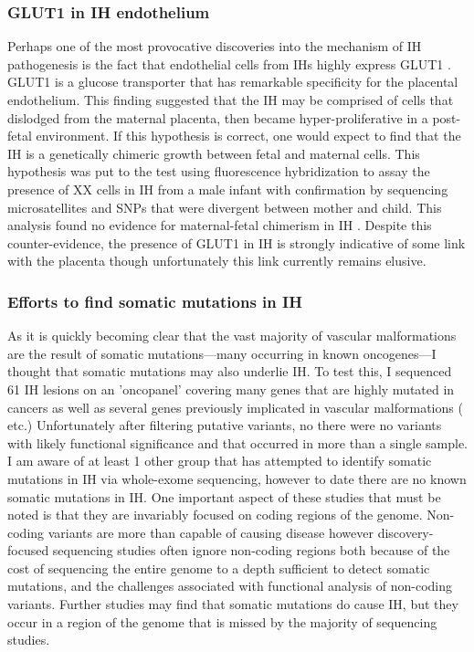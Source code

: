 \subsubsection{GLUT1 in IH endothelium}
Perhaps one of the most provocative discoveries into the mechanism of IH pathogenesis is the fact that endothelial cells from IHs highly express GLUT1 \citep{north2000, north2001}. GLUT1 is a glucose transporter that has remarkable specificity for the placental endothelium. This finding suggested that the IH may be comprised of cells that dislodged from the maternal placenta, then became hyper-proliferative in a post-fetal environment. If this hypothesis is correct, one would expect to find that the IH is a genetically chimeric growth between fetal and maternal cells. This hypothesis was put to the test using fluorescence  hybridization to assay the presence of XX cells in IH from a male infant with confirmation by sequencing microsatellites and SNPs that were divergent between mother and child. This analysis found no evidence for maternal-fetal chimerism in IH \citep{pittman2006}. Despite this counter-evidence, the presence of GLUT1 in IH is strongly indicative of some link with the placenta though unfortunately this link currently remains elusive.
\subsubsection{Efforts to find somatic mutations in IH}
As it is quickly becoming clear that the vast majority of vascular malformations are the result of somatic mutations—many occurring in known oncogenes—I thought that somatic mutations may also underlie IH. To test this, I sequenced 61 IH lesions on an 'oncopanel' covering many genes that are highly mutated in cancers as well as several genes previously implicated in vascular malformations ( etc.) Unfortunately after filtering putative variants, no there were no variants with likely functional significance and that occurred in more than a single sample. I am aware of at least 1 other group that has attempted to identify somatic mutations in IH via whole-exome sequencing, however to date there are no known somatic mutations in IH. One important aspect of these studies that must be noted is that they are invariably focused on coding regions of the genome. Non-coding variants are more than capable of causing disease however discovery-focused sequencing studies often ignore non-coding regions both because of the cost of sequencing the entire genome to a depth sufficient to detect somatic mutations, and the challenges associated with functional analysis of non-coding variants. Further studies may find that somatic mutations do cause IH, but they occur in a region of the genome that is missed by the majority of sequencing studies. 

